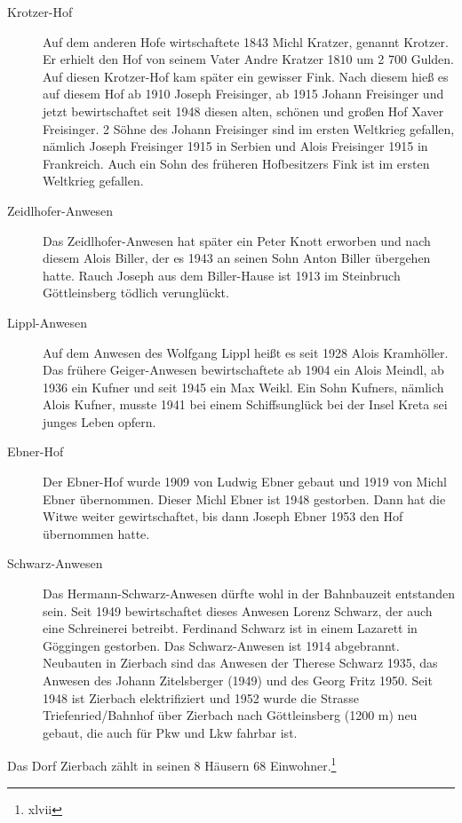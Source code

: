 \documentclass{book}
\begin{document}
\begin{description}
\item[Krotzer-Hof] Auf dem anderen Hofe wirtschaftete 1843 Michl
Kratzer, genannt Krotzer. Er erhielt den Hof von seinem Vater Andre
Kratzer 1810 um 2 700 Gulden. Auf diesen Krotzer-Hof kam später ein
gewisser Fink. Nach diesem hieß es auf diesem Hof ab 1910 Joseph
Freisinger, ab 1915 Johann Freisinger und jetzt bewirtschaftet seit 1948
diesen alten, schönen und großen Hof Xaver Freisinger. 2 Söhne des
Johann Freisinger sind im ersten Weltkrieg gefallen, nämlich Joseph
Freisinger 1915 in Serbien und Alois Freisinger 1915 in Frankreich. Auch
ein Sohn des früheren Hofbesitzers Fink ist im ersten Weltkrieg
gefallen.

\item[Zeidlhofer-Anwesen] Das Zeidlhofer-Anwesen hat später ein Peter
Knott erworben und nach diesem Alois Biller, der es 1943 an seinen Sohn
Anton Biller übergehen hatte. Rauch Joseph aus dem Biller-Hause ist 1913
im Steinbruch Göttleinsberg tödlich verunglückt.

\item[Lippl-Anwesen] Auf dem Anwesen des Wolfgang Lippl heißt es seit
1928 Alois Kramhöller. Das frühere Geiger-Anwesen bewirtschaftete ab
1904 ein Alois Meindl, ab 1936 ein Kufner und seit 1945 ein Max Weikl.
Ein Sohn Kufners, nämlich Alois Kufner, musste 1941 bei einem
Schiffsunglück bei der Insel Kreta sei junges Leben opfern.

\item[Ebner-Hof] Der Ebner-Hof wurde 1909 von Ludwig Ebner gebaut und
1919 von Michl Ebner übernommen. Dieser Michl Ebner ist 1948 gestorben.
Dann hat die Witwe weiter gewirtschaftet, bis dann Joseph Ebner 1953 den
Hof übernommen hatte.

\item[Schwarz-Anwesen] Das Hermann-Schwarz-Anwesen dürfte wohl in der
Bahnbauzeit entstanden sein. Seit 1949 bewirtschaftet dieses Anwesen
Lorenz Schwarz, der auch eine Schreinerei betreibt. Ferdinand Schwarz
ist in einem Lazarett in Göggingen gestorben. Das Schwarz-Anwesen ist
1914 abgebrannt. Neubauten in Zierbach sind das Anwesen der Therese
Schwarz 1935, das Anwesen des Johann Zitelsberger (1949) und des Georg
Fritz 1950. Seit 1948 ist Zierbach elektrifiziert und 1952 wurde die
Strasse Triefenried/Bahnhof über Zierbach nach Göttleinsberg (1200 m)
neu gebaut, die auch für Pkw und Lkw fahrbar ist.
\end{description}

Das Dorf Zierbach zählt in seinen 8 Häusern 68 Einwohner.\footnote{xlvii}
\end{document}
